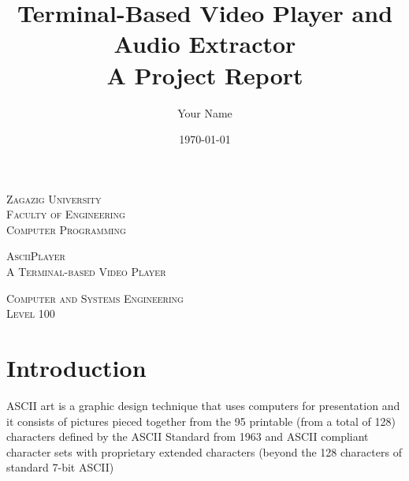 \documentclass[a4paper,12pt]{article}
\title{Terminal-Based Video Player and Audio Extractor\\
       \large A Project Report}
\author{Your Name}
\date{\today}
\begin{document}
\begin{titlepage}

\begin{center}
    \textsc{Zagazig University \\}
	\textsc{Faculty of Engineering \\}
	\fontsize{5mm}{10mm}\selectfont 
  \textsc{Computer Programming  \\}
	\vspace{40mm}
 
  

	\fontsize{15mm}{10mm} 
	\textsc{AsciiPlayer\\}
	\fontsize{5mm}{10mm} 
	\textsc{A Terminal-based Video Player \\}
        \vspace{20mm}



\end{center}

\vspace{80mm}


\begin{center}
    
 
    \fontsize{5mm}{7mm}\selectfont 
    \textsc{{Computer and Systems Engineering } \\}
 	\vspace{1mm}
        \textsc{Level 100}
        \vspace{10mm}



\end{center}


\end{titlepage}

\tableofcontents
\newpage

\section{Introduction}
ASCII art is a graphic design technique that uses computers for presentation and it consists of pictures pieced together from the 95 printable (from a total of 128) characters defined by the ASCII Standard from 1963 and ASCII compliant character sets with proprietary extended characters (beyond the 128 characters of standard 7-bit ASCII)
\end{document}
